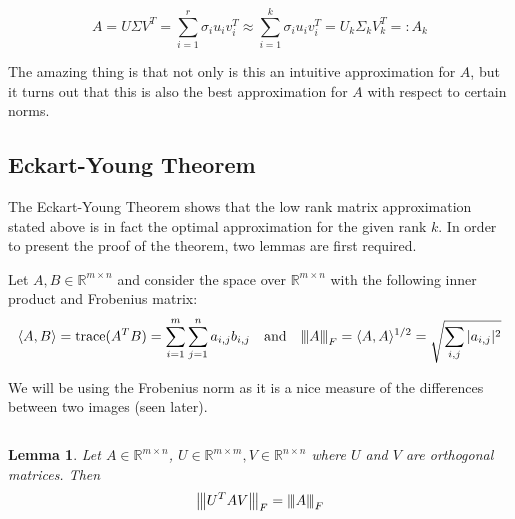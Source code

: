 \documentclass[a4paper]{article}
\newcommand{\norm}[1]{{\left\vert\kern-0.25ex\left\vert\kern-0.25ex\left\vert #1 
    \right\vert\kern-0.25ex\right\vert\kern-0.25ex\right\vert}}
\newcommand{\trace}[1]{\text{trace}(#1)}
\newtheorem{lemma}[theorem]{Lemma}
\begin{document}




\begin{equation}
A = U\Sigma V^T = \sum_{i=1}^r\sigma_iu_iv_i^T \approx \sum_{i=1}^k\sigma_iu_iv_i^T = U_k \Sigma_k V_k^T =: A_k
\end{equation}

The amazing thing is that not only is this an intuitive approximation for $A$, but it turns out that this is also the best approximation for $A$ with respect to certain norms.


\subsection{Eckart-Young Theorem}

The Eckart-Young Theorem shows that the low rank matrix approximation stated above is in fact the optimal approximation for the given rank $k$.  In order to present the proof of the theorem, two lemmas are first required.

Let $A,B\in \mathbb{R}^{m\times n}$ and consider the space over $\mathbb{R}^{m\times n}$ with the following  inner product and  Frobenius matrix:
\begin{equation}
\langle A,B \rangle = \trace{A^TB} = \sum_{i=1}^m\sum_{j=1}^na_{i,j}b_{i,j} 
\quad \text{and} \quad
\norm{A}_F = \langle A,A \rangle^{1/2} = \sqrt{\sum_{i,j} |a_{i,j}|^2}
\end{equation}

We will be using the Frobenius norm as it is a nice measure of the differences between two images (seen later).

$$
$$


\begin{lemma}
Let $A \in \mathbb{R}^{m\times n}$, $U \in \mathbb{R}^{m\times m}, V\in \mathbb{R}^{n\times n}$
where $U$ and $V$ are orthogonal matrices. Then 
$$\norm{U^TAV}_F = \norm{A}_F$$
\end{lemma}
\end{document}
